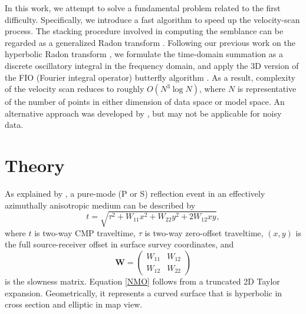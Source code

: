 
In this work, we attempt to solve a fundamental problem related to the first difficulty. Specifically, we introduce a fast algorithm to speed up the velocity-scan process. The stacking procedure involved in computing the semblance can be regarded as a generalized Radon transform \citep{Beylkin84}. Following our previous work on the hyperbolic Radon transform \citep{HFDY12, HFDY13}, we formulate the time-domain summation as a discrete oscillatory integral in the frequency domain, and apply the 3D version of the FIO (Fourier integral operator) butterfly algorithm \citep{CDY09}. As a result, complexity of the velocity scan reduces to roughly $O(N^3 \log N)$, where $N$ is representative of the number of points in either dimension of data space or model space. An alternative approach was developed by \cite{BF09}, but may not be applicable for noisy data.



\section{Theory}

As explained by \cite{GT98}, a pure-mode (P or S) reflection event in an effectively azimuthally anisotropic medium can be described by
\begin{equation} \label{NMO}
t=\sqrt{\tau^2+W_{11}x^2+W_{22}y^2+2W_{12}xy},
\end{equation}
where $t$ is two-way CMP traveltime, $\tau$ is two-way zero-offset traveltime, $(x,y)$ is the full source-receiver offset in surface survey coordinates, and
\begin{equation}
\mathbf{W}= \left( \begin{array}{cc}
W_{11} & W_{12}  \\
W_{12} & W_{22}  \end{array} \right)
\end{equation}
is the slowness matrix. Equation \ref{NMO} follows from a truncated 2D Taylor expansion. Geometrically, it represents a curved surface that is hyperbolic in cross section and elliptic in map view.

